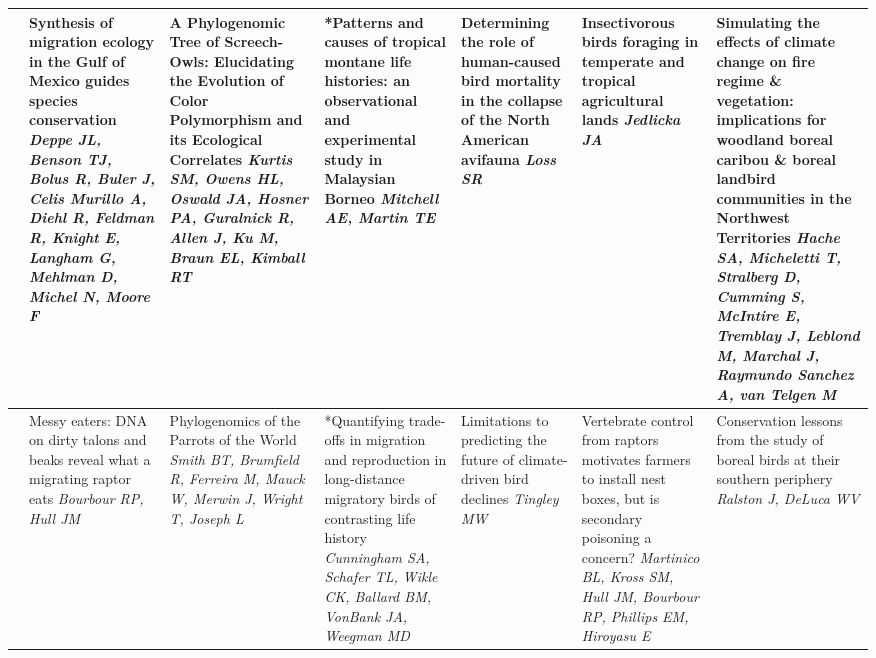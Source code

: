 \begin{tabular}{|x{0.75cm}|x{2.25cm}|x{2.25cm}|x{2.25cm}|a{2.25cm}|a{2.25cm}|a{2.25cm}|}
&Synthesis of migration ecology in the Gulf of Mexico guides species conservation \newline \newline \textit{Deppe JL, Benson TJ, Bolus R, Buler J, Celis Murillo A, Diehl R, Feldman R, Knight E, Langham G, Mehlman D, Michel N, Moore F} & A Phylogenomic Tree of Screech-Owls: Elucidating the Evolution of Color Polymorphism and its Ecological Correlates \newline \newline \textit{Kurtis SM, Owens HL, Oswald JA, Hosner PA, Guralnick R, Allen J, Ku M, Braun EL, Kimball RT} & *Patterns and causes of tropical montane life histories: an observational and experimental study in Malaysian Borneo \newline \newline \textit{Mitchell AE, Martin TE} & Determining the role of human-caused bird mortality in the collapse of the North American avifauna \newline \newline \textit{Loss SR} & Insectivorous birds foraging in temperate and tropical agricultural lands \newline \newline \textit{Jedlicka JA} & Simulating the effects of climate change on fire regime \& vegetation: implications for woodland boreal caribou \& boreal landbird communities in the Northwest Territories \newline \newline \textit{Hache SA, Micheletti T, Stralberg D, Cumming S, McIntire E, Tremblay J, Leblond M, Marchal J, Raymundo Sanchez A, van Telgen M}\\
\hline
{}&Messy eaters: DNA on dirty talons and beaks reveal what a migrating raptor eats \newline \newline \textit{Bourbour RP, Hull JM} & Phylogenomics of the Parrots of the World \newline \newline \textit{Smith BT, Brumfield R, Ferreira M, Mauck W, Merwin J, Wright T, Joseph L} & *Quantifying trade-offs in migration and reproduction in long-distance migratory birds of contrasting life history \newline \newline \textit{Cunningham SA, Schafer TL, Wikle CK, Ballard BM, VonBank JA, Weegman MD} & Limitations to predicting the future of climate-driven bird declines \newline \newline \textit{Tingley MW} & Vertebrate control from raptors motivates farmers to install nest boxes, but is secondary poisoning a concern? \newline \newline \textit{Martinico BL, Kross SM, Hull JM, Bourbour RP, Phillips EM, Hiroyasu E} & Conservation lessons from the study of boreal birds at their southern periphery \newline \newline \textit{Ralston J, DeLuca WV}\\

\end{tabular}
